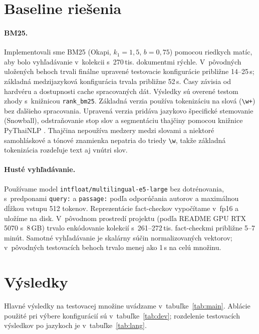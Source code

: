 \documentclass[11pt,a4paper]{article}
\begin{document}
\section{Baseline riešenia}
\label{sec:baseline}

\paragraph{BM25.}
Implementovali sme BM25 (Okapi, $k_1 = 1{,}5$, $b = 0{,}75$) pomocou riedkych matíc, aby bolo vyhľadávanie v~kolekcii s~270\,tis. dokumentmi rýchle.
V~pôvodných uložených behoch trvali finálne upravené testovacie konfigurácie približne 14--25\,s; základná medzijazyková konfigurácia trvala približne 52\,s.
Časy závisia od hardvéru a dostupnosti cache spracovaných dát.
Výsledky sú overené testom zhody s~knižnicou \texttt{rank\_bm25}.
Základná verzia používa tokenizáciu na slová (\texttt{\textbackslash w+}) bez ďalšieho spracovania.
Upravená verzia pridáva jazykovo špecifické stemovanie (Snowball), odstraňovanie stop slov a segmentáciu thajčiny pomocou knižnice PyThaiNLP \citep{phatthiyaphaibun-etal-2023-pythainlp}.
Thajčina nepoužíva medzery medzi slovami a niektoré samohláskové a tónové znamienka nepatria do triedy \texttt{\textbackslash w}, takže základná tokenizácia rozdeľuje text aj vnútri slov.

\paragraph{Husté vyhľadávanie.}
Používame model \texttt{intfloat/\allowbreak multilingual-\allowbreak e5-large} \citep{wang-etal-2024-multilingual-e5} bez dotrénovania, s~predponami \texttt{query:} a \texttt{passage:} podľa odporúčania autorov a maximálnou dĺžkou vstupu 512 tokenov.
Reprezentácie fact-checkov vypočítame v~fp16 a uložíme na disk.
V~pôvodnom prostredí projektu (podľa README GPU RTX 5070 s~8\,GB) trvalo enkódovanie kolekcií s~261--272\,tis. fact-checkmi približne 5--7 minút.
Samotné vyhľadávanie je skalárny súčin normalizovaných vektorov; v~pôvodných testovacích behoch trvalo menej ako 1\,s na celú množinu.

\section{Výsledky}
\label{sec:results}

Hlavné výsledky na testovacej množine uvádzame v~tabuľke~\ref{tab:main}.
Ablácie použité pri výbere konfigurácií sú v~tabuľke~\ref{tab:dev}; rozdelenie testovacích výsledkov po jazykoch je v~tabuľke~\ref{tab:lang}.
\end{document}
